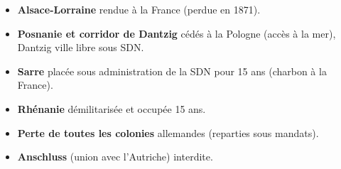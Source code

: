 \documentclass[11pt]{article}
\begin{document}
\begin{exemplebox}
\begin{itemize}
    \item \textbf{Alsace-Lorraine} rendue à la France (perdue en 1871).
    \item \textbf{Posnanie et corridor de Dantzig} cédés à la Pologne (accès à la mer), Dantzig ville libre sous SDN.
    \item \textbf{Sarre} placée sous administration de la SDN pour 15 ans (charbon à la France).
    \item \textbf{Rhénanie} démilitarisée et occupée 15 ans.
    \item \textbf{Perte de toutes les colonies} allemandes (reparties sous mandats).
    \item \textbf{Anschluss} (union avec l'Autriche) interdite.
\end{itemize}
\end{exemplebox}
\end{document}
